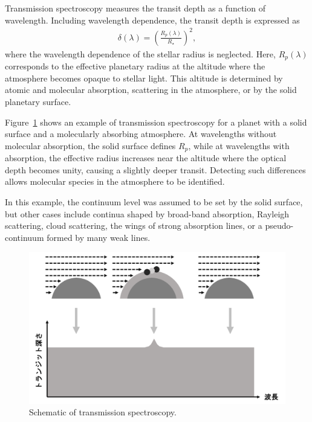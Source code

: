 Transmission spectroscopy measures the transit depth as a function of wavelength. Including wavelength dependence, the transit depth is expressed as
\begin{align}
\delta (\lambda) = \left( \frac{R_p(\lambda)}{R_\star} \right)^2,
\end{align}
where the wavelength dependence of the stellar radius is neglected. Here, $R_p(\lambda)$ corresponds to the effective planetary radius at the altitude where the atmosphere becomes opaque to stellar light. This altitude is determined by atomic and molecular absorption, scattering in the atmosphere, or by the solid planetary surface.  

Figure~\ref{fig:transmission} shows an example of transmission spectroscopy for a planet with a solid surface and a molecularly absorbing atmosphere. At wavelengths without molecular absorption, the solid surface defines $R_p$, while at wavelengths with absorption, the effective radius increases near the altitude where the optical depth becomes unity, causing a slightly deeper transit. Detecting such differences allows molecular species in the atmosphere to be identified.  

In this example, the continuum level was assumed to be set by the solid surface, but other cases include continua shaped by broad-band absorption, Rayleigh scattering, cloud scattering, the wings of strong absorption lines, or a pseudo-continuum formed by many weak lines.  

\begin{figure}[htb]
\begin{center}
\includegraphics[width=\linewidth]{fig/transmission.png}
\caption{Schematic of transmission spectroscopy.\label{fig:transmission}}
\end{center}
\end{figure}

